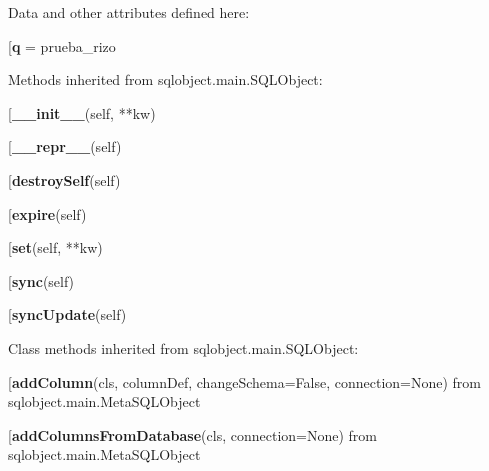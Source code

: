 Data and other attributes defined here:\\
\begin{description}\item[{\bf q} = prueba\_rizo\end{description}


Methods inherited from sqlobject.main.SQLObject:\\
\begin{description}\item[{\bf \_\_init\_\_}(self, **kw)\end{description}

\begin{description}\item[{\bf \_\_repr\_\_}(self)\end{description}

\begin{description}\item[{\bf destroySelf}(self)\end{description}

\begin{description}\item[{\bf expire}(self)\end{description}

\begin{description}\item[{\bf set}(self, **kw)\end{description}

\begin{description}\item[{\bf sync}(self)\end{description}

\begin{description}\item[{\bf syncUpdate}(self)\end{description}


Class methods inherited from sqlobject.main.SQLObject:\\
\begin{description}\item[{\bf addColumn}(cls, columnDef, changeSchema=False, connection=None) from sqlobject.main.MetaSQLObject\end{description}

\begin{description}\item[{\bf addColumnsFromDatabase}(cls, connection=None) from sqlobject.main.MetaSQLObject\end{description}

